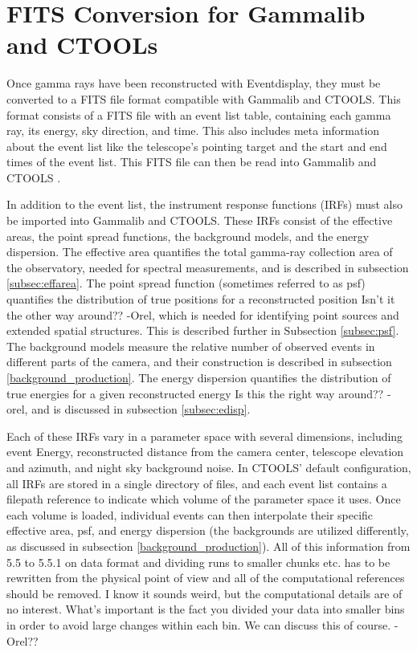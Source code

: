 \section{FITS Conversion for Gammalib and CTOOLs}\label{fitsconversion}
  Once gamma rays have been reconstructed with Eventdisplay, they must be converted to a FITS file format compatible with Gammalib and CTOOLS.
  This format consists of a FITS file with an event list table, containing each gamma ray, its energy, sky direction, and time.
  This also includes meta information about the event list like the telescope's pointing target and the start and end times of the event list.
  This FITS file can then be read into Gammalib and CTOOLS \cite{gammalibctools}.

  In addition to the event list, the instrument response functions (IRFs) must also be imported into Gammalib and CTOOLS.
  These IRFs consist of the effective areas, the point spread functions, the background models, and the energy dispersion.
  The effective area quantifies the total gamma-ray collection area of the observatory, needed for spectral measurements, and is described in subsection \ref{subsec:effarea}.
  The point spread function (sometimes referred to as psf) quantifies the distribution of true positions for a reconstructed position {\color{red}Isn't it the other way around?? -Orel}, which is needed for identifying point sources and extended spatial structures.
  This is described further in Subsection \ref{subsec:psf}.
  The background models measure the relative number of observed events in different parts of the camera, and their construction is described in subsection \ref{background_production}.
  The energy dispersion quantifies the distribution of true energies for a given reconstructed energy {\color{red}Is this the right way around?? -orel}, and is discussed in subsection \ref{subsec:edisp}.

  Each of these IRFs vary in a parameter space with several dimensions, including event Energy, reconstructed distance from the camera center, telescope elevation and azimuth, and night sky background noise.
  In CTOOLS' default configuration, all IRFs are stored in a single directory of files, and each event list contains a filepath reference to indicate which volume of the parameter space it uses.
  Once each volume is loaded, individual events can then interpolate their specific effective area, psf, and energy dispersion (the backgrounds are utilized differently, as discussed in subsection \ref{background_production}).
  {\color{red}All of this information from 5.5 to 5.5.1 on data format and dividing runs to smaller chunks etc. has to be rewritten from the physical point of view and all of the computational references should be removed. I know it sounds weird, but the computational details are of no interest. What’s important is the fact you divided your data into smaller bins in order to avoid large changes within each bin.  We can discuss this of course. -Orel??}

